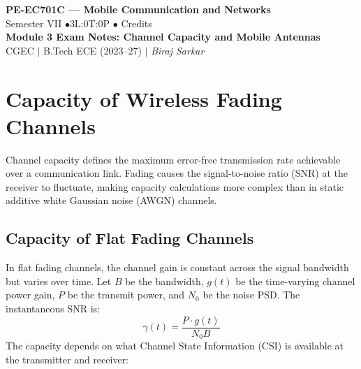 \documentclass[12pt,a4paper]{article}
\begin{document}

\begin{center}
  {\LARGE\bfseries\color{myred} PE-EC701C --- Mobile Communication and Networks}\\[5pt]
  {\normalsize\color{mydark} Semester VII \quad$\bullet$\quad 3L:0T:0P \quad$\bullet$ Credits}\\[3pt]
  {\normalsize\color{myteal}\textbf{Module 3 Exam Notes: Channel Capacity and Mobile Antennas}}\\[3pt]
  {\small\color{mydark} CGEC \;$|$\; B.Tech ECE (2023--27) \;$|$\; \textit{Biraj Sarkar}}
\end{center}
\noindent{\color{myred}\rule{\linewidth}{1.5pt}}
\vspace{2pt}

\hypersetup{linkcolor=mydark}
\tableofcontents
\hypersetup{linkcolor=myteal}
\newpage

\section{Capacity of Wireless Fading Channels}

Channel capacity defines the maximum error-free transmission rate achievable over a communication link. Fading causes the signal-to-noise ratio (SNR) at the receiver to fluctuate, making capacity calculations more complex than in static additive white Gaussian noise (AWGN) channels.

\subsection{Capacity of Flat Fading Channels}
In flat fading channels, the channel gain is constant across the signal bandwidth but varies over time. Let $B$ be the bandwidth, $g(t)$ be the time-varying channel power gain, $P$ be the transmit power, and $N_0$ be the noise PSD. The instantaneous SNR is:
\begin{equation}
  \gamma(t) = \frac{P \cdot g(t)}{N_0 B}
\end{equation}
The capacity depends on what Channel State Information (CSI) is available at the transmitter and receiver:
\end{document}
